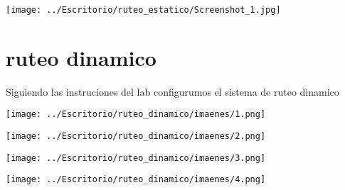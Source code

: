 \documentclass[11pt,a4paper]{report}
\begin{document}
\texttt{[image: ../Escritorio/ruteo\_estatico/Screenshot\_1.jpg]}

\part{ruteo dinamico}

Siguiendo las instruciones del lab configurumos el sistema de ruteo dinamico

\texttt{[image: ../Escritorio/ruteo\_dinamico/imaenes/1.png]}

\texttt{[image: ../Escritorio/ruteo\_dinamico/imaenes/2.png]} 

\texttt{[image: ../Escritorio/ruteo\_dinamico/imaenes/3.png]} 
   
\texttt{[image: ../Escritorio/ruteo\_dinamico/imaenes/4.png]} 
\end{document}
